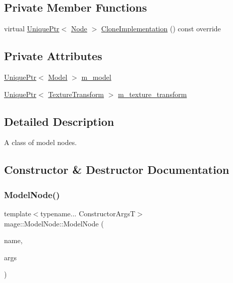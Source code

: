 \subsection*{Private Member Functions}
\begin{DoxyCompactItemize}
\item 
virtual \hyperlink{namespacemage_a3316d7143a973e37adf1110f2e80ca31}{Unique\+Ptr}$<$ \hyperlink{classmage_1_1_node}{Node} $>$ \hyperlink{classmage_1_1_model_node_a34146201083015276b38240af307417f}{Clone\+Implementation} () const override
\end{DoxyCompactItemize}
\subsection*{Private Attributes}
\begin{DoxyCompactItemize}
\item 
\hyperlink{namespacemage_a3316d7143a973e37adf1110f2e80ca31}{Unique\+Ptr}$<$ \hyperlink{classmage_1_1_model}{Model} $>$ \hyperlink{classmage_1_1_model_node_a784faf19f736a1c74808321ed0e52d36}{m\+\_\+model}
\item 
\hyperlink{namespacemage_a3316d7143a973e37adf1110f2e80ca31}{Unique\+Ptr}$<$ \hyperlink{classmage_1_1_texture_transform}{Texture\+Transform} $>$ \hyperlink{classmage_1_1_model_node_a24888374dcf3e1fdba4a3a0790931a0a}{m\+\_\+texture\+\_\+transform}
\end{DoxyCompactItemize}


\subsection{Detailed Description}
A class of model nodes. 

\subsection{Constructor \& Destructor Documentation}
\hypertarget{classmage_1_1_model_node_a588aa714637e3e17e764e08c9035bf60}{}\label{classmage_1_1_model_node_a588aa714637e3e17e764e08c9035bf60} 
\subsubsection{\texorpdfstring{Model\+Node()}{ModelNode()}\hspace{0.1cm}{\footnotesize\ttfamily [1/4]}}
{\footnotesize\ttfamily template$<$typename... Constructor\+ArgsT$>$ \\
mage\+::\+Model\+Node\+::\+Model\+Node (\begin{DoxyParamCaption}\item[{string}]{name,  }\item[{Constructor\+ArgsT \&\&...}]{args }\end{DoxyParamCaption})\hspace{0.3cm}{\ttfamily [explicit]}}

